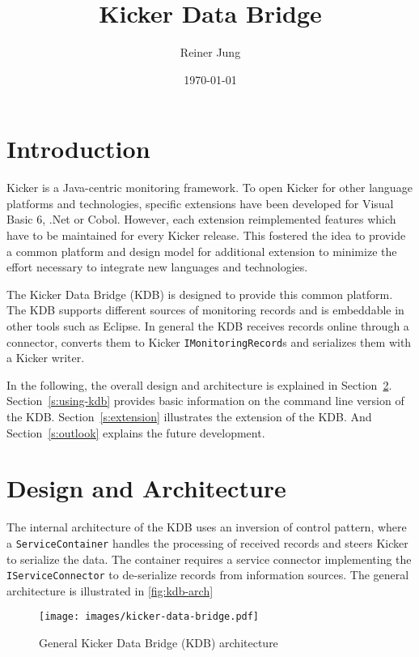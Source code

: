 \documentclass[11pt,a4paper]{article}
\title{Kicker Data Bridge}
\author{Reiner Jung}
\date{\today}
\begin{document}
\maketitle

\tableofcontents

\section{Introduction}  

Kicker is a Java-centric monitoring framework. To open Kicker for other language platforms and technologies, specific extensions have been developed for Visual Basic 6, .Net or Cobol. However, each extension reimplemented features which have to be maintained for every Kicker release. This fostered the idea to provide a common platform and design model for additional extension to minimize the effort necessary to integrate new languages and technologies.

The Kicker Data Bridge (KDB) is designed to provide this common platform. The KDB supports different sources of monitoring records and is embeddable in other tools such as Eclipse. In general the KDB receives records online through a connector, converts them to Kicker \texttt{IMonitoringRecord}s and serializes them with a Kicker writer.

In the following, the overall design and architecture is explained in Section~\ref{s:design}. Section~\ref{s:using-kdb} provides basic information on the command line version of the KDB. Section~\ref{s:extension} illustrates the extension of the KDB. And Section~\ref{s:outlook} explains the future development.

\section{Design and Architecture}\label{s:design}

The internal architecture of the KDB uses an inversion of control pattern, where a \texttt{ServiceContainer} handles the processing of received records and steers Kicker to serialize the data. The container requires a service connector implementing the \texttt{IServiceConnector} to de-serialize records from information sources. The general architecture is illustrated in \autoref{fig:kdb-arch}

\begin{figure}[htb]
\texttt{[image: images/kicker-data-bridge.pdf]}
\caption{General Kicker Data Bridge (KDB) architecture}
\label{fig:kdb-arch}
\end{figure}
\end{document}
